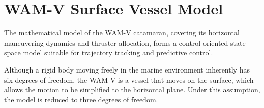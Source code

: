 \section{WAM-V Surface Vessel Model}
\label{sec:mod_usv}

The mathematical model of the WAM-V catamaran, covering its horizontal maneuvering dynamics and thruster allocation, forms a control-oriented state-space model suitable for trajectory tracking and predictive control.

Although a rigid body moving freely in the marine environment inherently has six degrees of freedom, the WAM-V is a vessel that moves on the surface, which allows the motion to be simplified to the horizontal plane. Under this assumption, the model is reduced to three degrees of freedom.

